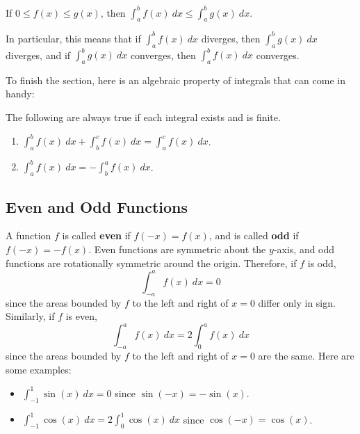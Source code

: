 \begin{theorem}
If $0\leq f(x) \leq g(x)$, then $\int_a^b f(x)\ dx \leq \int_a^b g(x)\ dx$.
\end{theorem}

In particular, this means that if $\int_a^b f(x)\ dx$ diverges, then $\int_a^b g(x)\ dx$ diverges, and if $\int_a^b g(x)\ dx$ converges, then $\int_a^b f(x)\ dx$ converges.


To finish the section, here is an algebraic property of integrals that can come in handy:
\begin{theorem} The following are always true if each integral exists and is finite.
\begin{enumerate}
\item $\displaystyle\int_a^bf(x)\ dx + \int_b^cf(x)\ dx = \int_a^c f(x)\ dx$.
\item $\displaystyle\int_a^bf(x)\ dx = -\int_b^a f(x)\ dx$.
\end{enumerate}
\end{theorem}


\subsection{Even and Odd Functions}

A function $f$ is called \textbf{even} if $f(-x)=f(x)$, and is called \textbf{odd} if $f(-x)=-f(x)$. Even functions are symmetric about the $y$-axis, and odd functions are rotationally symmetric around the origin. Therefore, if $f$ is odd,
$$\int_{-a}^af(x)\ dx = 0$$
since the areas bounded by $f$ to the left and right of $x=0$ differ only in sign. Similarly, if $f$ is even,
$$\int_{-a}^af(x)\ dx = 2\int_{0}^af(x)\ dx$$
since the areas bounded by $f$ to the left and right of $x=0$ are the same.
Here are some examples:
\begin{itemize}
\item $\int_{-1}^1\sin(x)\ dx = 0$ since $\sin(-x)=-\sin(x)$.
\item $\int_{-1}^1\cos(x)\ dx = 2\int_0^1\cos(x)\ dx$ since $\cos(-x)=\cos(x)$.
\end{itemize}




